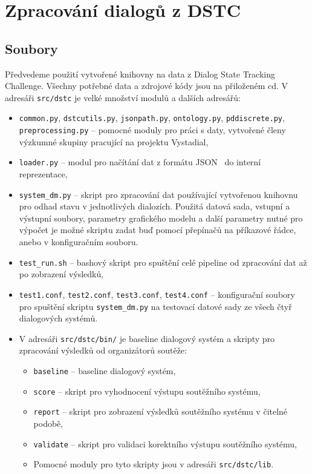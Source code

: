 \chapter{Zpracování dialogů z DSTC}
\label{ap:dstc}

\section{Soubory}

Předvedeme použití vytvořené knihovny na data z Dialog State Tracking Challenge.
Všechny potřebné data a zdrojové kódy jsou na přiloženém cd.
V adresáři \texttt{src/dstc} je velké množství modulů a dalších adresářů:
\begin{itemize}
\item \texttt{common.py}, \texttt{dstcutils.py}, \texttt{jsonpath.py}, \texttt{ontology.py}, \texttt{pddiscrete.py}, \texttt{preprocessing.py} -- pomocné moduly pro práci s daty, vytvořené členy výzkumné skupiny pracující na projektu Vystadial,

\item \texttt{loader.py} -- modul pro načítání dat z formátu JSON~\cite{crockford2006application} do interní reprezentace, 

\item \texttt{system\_dm.py} -- skript pro zpracování dat používající vytvořenou knihovnu pro odhad stavu v jednotlivých dialozích.
Použitá datová sada, vstupní a výstupní soubory, parametry grafického modelu a další parametry nutné pro výpočet je možné skriptu zadat buď pomocí přepínačů na příkazové řádce, anebo v konfiguračním souboru.

\item \texttt{test\_run.sh} -- bashový skript pro spuštění celé pipeline od zpracování dat až po zobrazení výsledků,

\item \texttt{test1.conf}, \texttt{test2.conf}, \texttt{test3.conf}, \texttt{test4.conf} -- konfigurační soubory pro spuštění skriptu \texttt{system\_dm.py} na testovací datové sady ze všech čtyř dialogových systémů.

\item V adresáři \texttt{src/dstc/bin/} je baseline dialogový systém a skripty pro zpracování výsledků od organizátorů soutěže:
	\begin{itemize}
	\item \texttt{baseline} -- baseline dialogový systém,
	\item \texttt{score} -- skript pro vyhodnocení výstupu soutěžního systému,
	\item \texttt{report} -- skript pro zobrazení výsledků soutěžního systému v čitelné podobě,
	\item \texttt{validate} -- skript pro validaci korektního výstupu soutěžního systému,
	\item Pomocné moduly pro tyto skripty jsou v adresáři \texttt{src/dstc/lib}.
	\end{itemize}


\end{itemize}
